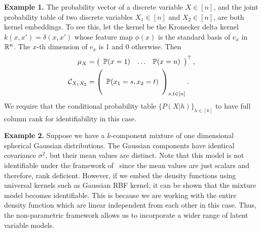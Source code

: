 \documentclass{article}
\begin{document}
{\bf Example 1.} The probability vector of a discrete variable $X \in [n]$, and the joint probability table of two discrete variables $X_1 \in [n]$ and $X_2 \in [n]$, are both kernel embeddings. To see this, let the kernel be the Kronecker delta kernel $k(x,x') = \delta(x,x')$ whose feature map $\phi(x)$ is the standard basis of $e_{x}$ in $\mathbb{R}^n$. The $x$-th dimension of $e_{x}$ is 1 and 0 otherwise. Then
\begin{align}
    \mu_X
		& = \left(
      \begin{array}{ccc}
         \mathbb{P}(x = 1) &
         \hdots &
         \mathbb{P}(x = n)
       \end{array}
    \right)^\top, \nonumber \\
		\mathcal{C}_{X_1X_2}
		&=
		\left(
        \begin{array}{c}
            \cr
            \mathbb{P}(x_1=s,x_2=t) \cr
						\cr
        \end{array}
    \right)_{s,t \in [n]}. \nonumber
\end{align}
We require that the conditional probability table $\{P(X|h)\}_{h\in [k]}$ to  have full column rank for identifiability in this case.


{\bf Example 2.} Suppose we have a $k$-component mixture of one dimensional  spherical Gaussian distributions. The Gaussian components have identical covariance  $\sigma^2$, but their mean values are distinct. Note that this model is not identifiable under the framework of~\cite{Hsu13} since the mean values are just scalars and therefore, rank deficient. However, if we embed the density functions using universal kernels such as Gaussian RBF kernel, it can be shown that the mixture model becomes identifiable. This is because we are working with the entire density function which are linear independent from each other in this case. Thus, the non-parametric framework allows us to incorporate a wider range of latent variable  models.



%
\end{document}

